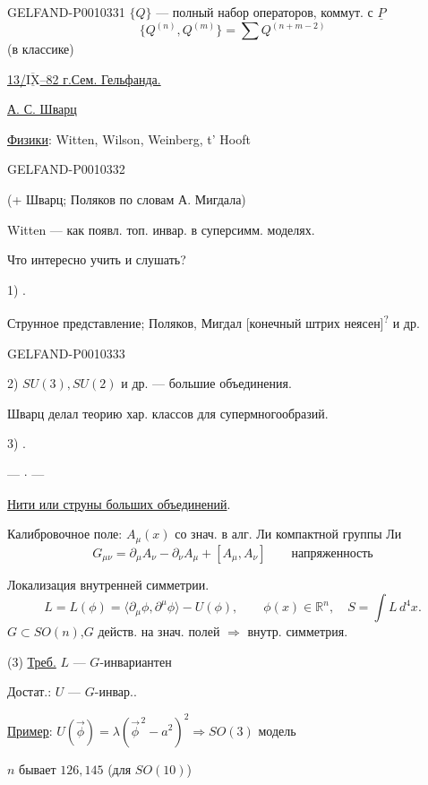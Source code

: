 \begin{GelfandAdjacentEvidence}{GELFAND-P001033}{1}
$\{Q\}$ --- полный набор операторов, коммут. с $\underline{P}$
\[
\{Q^{(n)},Q^{(m)}\}=\sum Q^{(n+m-2)}
\]
(в классике)

\underline{13/$\overline{\underline{\mathrm{IX}}}$--82 г.}\qquad \underline{Сем. Гельфанда.}

\underline{А. С. Шварц}

\underline{Физики}: Witten, Wilson, Weinberg, t' Hooft
\end{GelfandAdjacentEvidence}
\begin{GelfandAdjacentEvidence}{GELFAND-P001033}{2}


(+ Шварц; Поляков по словам А. Мигдала)

Witten --- как появл. топ. инвар. в суперсимм. моделях.

Что интересно учить и слушать?

1) .

Струнное представление; Поляков, Мигдал [конечный штрих неясен]\textsuperscript{?} и др.
\end{GelfandAdjacentEvidence}
\begin{GelfandAdjacentEvidence}{GELFAND-P001033}{3}


2) $SU(3),SU(2)$ и др. --- большие объединения.

Шварц делал теорию хар. классов для супермногообразий.

3)   .

\begin{center}--- $\cdot$ ---\end{center}

\underline{Нити или струны больших объединений}.

Калибровочное поле: $A_\mu(x)$ со знач. в алг. Ли компактной группы Ли
\begin{equation*}
G_{\mu\nu}=\partial_\mu A_\nu-\partial_\nu A_\mu+[A_\mu,A_\nu]
\qquad \text{напряженность}
\tag{1}
\end{equation*}

Локализация внутренней симметрии.
\begin{equation*}
L=L(\phi)=\langle\partial_\mu\phi,\partial^\mu\phi\rangle-U(\phi),
\qquad \phi(x)\in\mathbb R^n,\quad S=\int L\,d^4x.
\tag{2}
\end{equation*}
$G\subset SO(n)$,\qquad $G$ действ. на знач. полей $\Rightarrow$ внутр. симметрия.

(3) \underline{Треб.} $L$ --- $G$-инвариантен

Достат.: $U$ --- $G$-инвар..

\underline{Пример}: $U(\vec\phi)=\lambda(\vec\phi^{\,2}-a^2)^2\Rightarrow SO(3)$ модель

$n$ бывает $126,145$ (для $SO(10)$)
\end{GelfandAdjacentEvidence}
